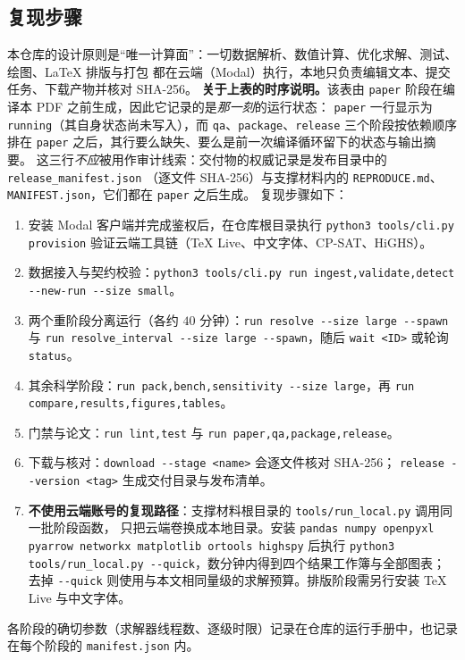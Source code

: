 \subsection{复现步骤}

本仓库的设计原则是“唯一计算面”：一切数据解析、数值计算、优化求解、测试、绘图、\LaTeX{} 排版与打包
都在云端（Modal）执行，本地只负责编辑文本、提交任务、下载产物并核对 SHA-256。
\textbf{关于上表的时序说明。}该表由 \texttt{paper} 阶段在编译本 PDF 之前生成，因此它记录的是\emph{那一刻}的运行状态：
\texttt{paper} 一行显示为 \texttt{running}（其自身状态尚未写入），而 \texttt{qa}、\texttt{package}、\texttt{release}
三个阶段按依赖顺序排在 \texttt{paper} 之后，其行要么缺失、要么是前一次编译循环留下的状态与输出摘要。
这三行\emph{不应}被用作审计线索：交付物的权威记录是发布目录中的 \nolinkurl{release_manifest.json}
（逐文件 SHA-256）与支撑材料内的 \nolinkurl{REPRODUCE.md}、\nolinkurl{MANIFEST.json}，它们都在 \texttt{paper} 之后生成。
复现步骤如下：

\begin{enumerate}[leftmargin=1.8em,itemsep=0.15em]
  \item 安装 Modal 客户端并完成鉴权后，在仓库根目录执行 \texttt{python3 tools/cli.py provision}
        验证云端工具链（\TeX{} Live、中文字体、CP-SAT、HiGHS）。
  \item 数据接入与契约校验：\texttt{python3 tools/cli.py run ingest,validate,detect -{}-new-run -{}-size small}。
  \item 两个重阶段分离运行（各约 $40$ 分钟）：\texttt{run resolve -{}-size large -{}-spawn} 与
        \texttt{run resolve\_interval -{}-size large -{}-spawn}，随后 \texttt{wait <ID>} 或轮询 \texttt{status}。
  \item 其余科学阶段：\texttt{run pack,bench,sensitivity -{}-size large}，再 \texttt{run compare,results,figures,tables}。
  \item 门禁与论文：\texttt{run lint,test} 与 \texttt{run paper,qa,package,release}。
  \item 下载与核对：\texttt{download -{}-stage <name>} 会逐文件核对 SHA-256；
        \texttt{release -{}-version <tag>} 生成交付目录与发布清单。
  \item \textbf{不使用云端账号的复现路径}：支撑材料根目录的 \nolinkurl{tools/run_local.py} 调用同一批阶段函数，
        只把云端卷换成本地目录。安装 \texttt{pandas numpy openpyxl pyarrow networkx matplotlib ortools highspy} 后执行
        \texttt{python3 tools/run\_local.py -{}-quick}，数分钟内得到四个结果工作簿与全部图表；
        去掉 \texttt{-{}-quick} 则使用与本文相同量级的求解预算。排版阶段需另行安装 \TeX{} Live 与中文字体。
\end{enumerate}
各阶段的确切参数（求解器线程数、逐级时限）记录在仓库的运行手册中，也记录在每个阶段的 \nolinkurl{manifest.json} 内。

